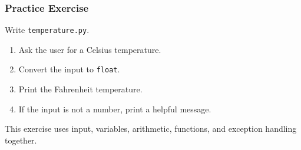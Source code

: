 \documentclass{beamer}
\begin{document}
	\begin{frame}
		\frametitle{Practice Exercise}

		Write \texttt{temperature.py}.
		\begin{enumerate}
			\item Ask the user for a Celsius temperature.
			\item Convert the input to \texttt{float}.
			\item Print the Fahrenheit temperature.
			\item If the input is not a number, print a helpful message.
		\end{enumerate}

		This exercise uses input, variables, arithmetic, functions, and exception
		handling together.
	\end{frame}
\end{document}
